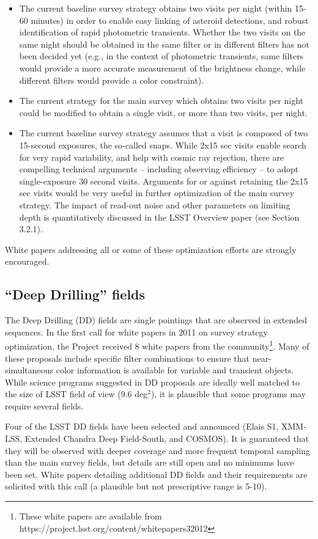 \documentclass[DM,lsstdraft,toc,usenatbib]{lsstdoc}
\begin{document}
\begin{itemize}
\item The current baseline survey strategy obtains two visits per night (within 15-60 minutes) in 
order to enable easy linking of asteroid detections, and robust identification of rapid 
photometric transients. Whether the two visits on the same night should be obtained 
in the same filter or in different filters has not been decided yet (e.g., in the context
of photometric transients, same filters would provide a more accurate measurement
of the brightness change, while different filters would provide a color constraint). 
\item The current strategy for the main survey which obtains two visits per night could be 
modified to obtain a single visit, or more than two visits, per night. 
\item The current baseline survey strategy assumes that a visit is composed of two 15-second
exposures, the so-called snaps. While 2x15 sec visits enable search for very rapid variability,
and help with cosmic ray rejection, there are compelling technical arguments -- including observing efficiency -- 
to adopt single-exposure 30 second visits. Arguments for or against retaining the 2x15 sec visits 
would be very useful in further optimization of the main survey strategy. 
The impact of read-out noise and other parameters on limiting depth is quantitatively
discussed in the LSST Overview paper (see Section 3.2.1). 
\end{itemize}
White papers addressing all or some of these optimization efforts are strongly encouraged.


\subsection{``Deep Drilling'' fields} 

The Deep Drilling (DD) fields are single pointings that are observed in extended sequences. 
In the first call for white papers in 2011 on survey strategy optimization, the Project received 
8 white papers from the community\footnote{These white papers are available from 
https://project.lsst.org/content/whitepapers32012}. Many of these proposals include specific 
filter combinations to ensure that near-simultaneous color information is available for 
variable and transient objects. While science programs suggested in DD proposals are ideally well 
matched to the size of LSST field of view (9.6 deg$^2$), it is plausible that some
programs may require several fields. 

Four of the LSST DD fields have been selected and announced (Elais S1, 
XMM-LSS, Extended Chandra Deep Field-South, and COSMOS). It is guaranteed that they 
will be observed with deeper coverage and more frequent temporal sampling than the main 
survey fields, but details are still open and no minimums have been set. White papers detailing additional DD fields and their
requirements are solicited with this call (a plausible but not prescriptive range is 5-10).
\end{document}
